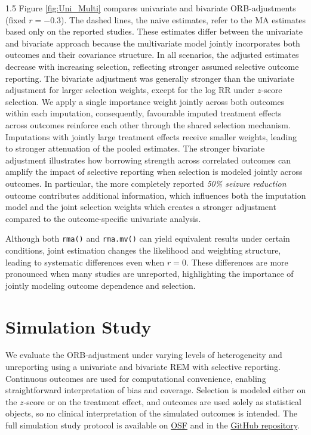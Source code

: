 \documentclass{article}
\begin{document}
\begin{spacing}{1.5}
Figure \ref{fig:Uni_Multi} compares univariate and bivariate ORB-adjustments (fixed $r=-0.3$). The dashed lines, the naive estimates, refer to the MA estimates based only on the reported studies. These estimates differ between the univariate and bivariate approach because the multivariate model jointly incorporates both outcomes and their covariance structure. In all scenarios, the adjusted estimates decrease with increasing selection, reflecting stronger assumed selective outcome reporting. The bivariate adjustment was generally stronger than the univariate adjustment for larger selection weights, except for the log RR under $z$-score selection. We apply a single importance weight jointly across both outcomes within each imputation, consequently, favourable imputed treatment effects across outcomes reinforce each other through the shared selection mechanism. Imputations with jointly large treatment effects receive smaller weights, leading to stronger attenuation of the pooled estimates. The stronger bivariate adjustment illustrates how borrowing strength across correlated outcomes can amplify the impact of selective reporting when selection is modeled jointly across outcomes. In particular, the more completely reported \textit{50\% seizure reduction} outcome contributes additional information, which influences both the imputation model and the joint selection weights which creates a stronger adjustment compared to the outcome-specific univariate analysis. 

Although both \texttt{rma()} and \texttt{rma.mv()} can yield equivalent results under certain conditions, joint estimation changes the likelihood and weighting structure, leading to systematic differences even when $r=0$. These differences are more pronounced when many studies are unreported, highlighting the importance of jointly modeling outcome dependence and selection. 


\section{Simulation Study}
\label{SimulationStudy}

We evaluate the ORB-adjustment under varying levels of heterogeneity and unreporting using a univariate and bivariate REM with selective reporting. Continuous outcomes are used for computational convenience, enabling straightforward interpretation of bias and coverage. Selection is modeled either on the $z$-score or on the treatment effect, and outcomes are used solely as statistical objects, so no clinical interpretation of the simulated outcomes is intended. The full simulation study protocol is available on \href{https://osf.io/5f4yx/overview}{OSF} and in the \href{https://github.com/cburgwin/ORB-project-MI-Approach/tree/main}{GitHub repository}.


\end{spacing}
\end{document}
